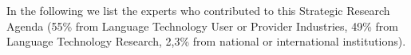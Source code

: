 \documentclass[10pt, plain]{../../metanetpaper}
\begin{document}

\clearpage

\appendix
{}





\clearpage


\label{sec:list-of-contributors}

In the following we list the experts who contributed to this Strategic Research Agenda (55\% from Language Technology User or Provider Industries, 49\% from Language Technology Research, 2,3\% from national or international institutions).

\end{document}
